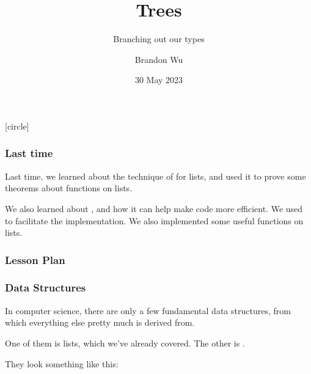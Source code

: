 \documentclass[aspectratio=169]{beamer}
\title{Trees} %
\subtitle{Branching out our types} %
\date{30 May 2023} %
\author{Brandon Wu} %
\newif\ifcolorlambda
\begin{document}
\ifweb
    \renewcommand{\pause}{}
\fi

[circle]

{
\begin{frame}[plain]
    \colorlambdatrue
    \titlepage
\end{frame}
}

\begin{frame}[fragile]
  \frametitle{Last time}

  Last time, we learned about the technique of  for lists, and
  used it to prove some theorems about functions on lists.

  \vspace{\fill}

  We also learned about , and how it can help make code more efficient. We
  used  to facilitate the implementation. We also implemented some useful
  functions on lists.
\end{frame}

\begin{frame}[fragile]
  \frametitle{Lesson Plan}

  \tableofcontents
\end{frame}


\begin{frame}[fragile]
  \frametitle{Data Structures}

  In computer science, there are only a few fundamental data structures, from which everything
  else pretty much is derived from.

  \pause
  \vspace{\fill}

  One of them is lists, which we've already covered. The other is .

  \pause
  \vspace{\fill}


  \pause
  \vspace{\fill}

  They look something like this:

  \vspace{\fill}

  \begin{center}
  \end{center}
\end{frame}
\end{document}
